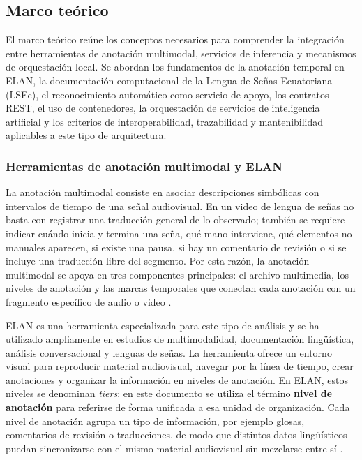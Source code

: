 \subsection{Marco teórico}

El marco teórico reúne los conceptos necesarios para comprender la integración entre herramientas de anotación multimodal, servicios de inferencia y mecanismos de orquestación local. Se abordan los fundamentos de la anotación temporal en ELAN, la documentación computacional de la Lengua de Señas Ecuatoriana (LSEc), el reconocimiento automático como servicio de apoyo, los contratos REST, el uso de contenedores, la orquestación de servicios de inteligencia artificial y los criterios de interoperabilidad, trazabilidad y mantenibilidad aplicables a este tipo de arquitectura.

\subsubsection{Herramientas de anotación multimodal y ELAN}

La anotación multimodal consiste en asociar descripciones simbólicas con intervalos de tiempo de una señal audiovisual. En un video de lengua de señas no basta con registrar una traducción general de lo observado; también se requiere indicar cuándo inicia y termina una seña, qué mano interviene, qué elementos no manuales aparecen, si existe una pausa, si hay un comentario de revisión o si se incluye una traducción libre del segmento. Por esta razón, la anotación multimodal se apoya en tres componentes principales: el archivo multimedia, los niveles de anotación y las marcas temporales que conectan cada anotación con un fragmento específico de audio o video \cite{wittenburg2006elan}.

ELAN es una herramienta especializada para este tipo de análisis y se ha utilizado ampliamente en estudios de multimodalidad, documentación lingüística, análisis conversacional y lenguas de señas. La herramienta ofrece un entorno visual para reproducir material audiovisual, navegar por la línea de tiempo, crear anotaciones y organizar la información en niveles de anotación. En ELAN, estos niveles se denominan \textit{tiers}; en este documento se utiliza el término \textbf{nivel de anotación} para referirse de forma unificada a esa unidad de organización. Cada nivel de anotación agrupa un tipo de información, por ejemplo glosas, comentarios de revisión o traducciones, de modo que distintos datos lingüísticos puedan sincronizarse con el mismo material audiovisual sin mezclarse entre sí \cite{wittenburg2006elan}.

